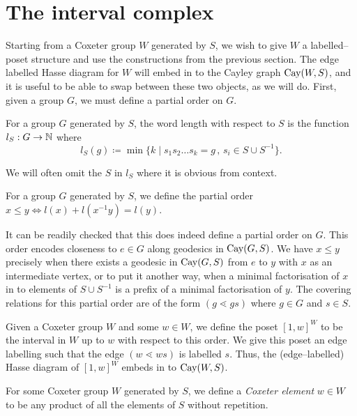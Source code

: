\documentclass[class=article, crop=false]{standalone}
\begin{document}
\section{The interval complex}
\label{sec:interval_cx}
Starting from a Coxeter group $W$ generated by $S$, we wish to give $W$ a labelled--poset structure and use the constructions from the previous section. The edge labelled Hasse diagram for $W$ will embed in to the Cayley graph $\text{Cay}(W,S)$, and it is useful to be able to swap between these two objects, as we will do. First, given a group $G$, we must define a partial order on $G$.

\begin{definition}
    For a group $G$ generated by $S$, the word length with respect to $S$ is the function $l_S:G\to \mathbb{\mathbb{N}}$ where
    \begin{equation*}
        l_S(g) \coloneq \min\{k \mid s_1s_2\ldots s_k=g \,,\, s_i \in S \cup S^{-1}\}.
    \end{equation*}
\end{definition}
We will often omit the $S$ in $l_S$ where it is obvious from context.

\begin{definition}
    For a group $G$ generated by $S$, we define the partial order $x \leq y \iff l(x) + l(x^{-1}y) = l(y)$.
\end{definition}

It can be readily checked that this does indeed define a partial 
order on $G$. This order encodes closeness to $e \in G$ along geodesics in $\text{Cay}(G,S)$. We have $x \leq y$ precisely when there exists a geodesic in $\text{Cay}(G, S)$ from $e$ to $y$ with $x$ as an intermediate vertex, or to put it another way, when a minimal factorisation of $x$ in to elements of $S \cup S^{-1}$ is a prefix of a minimal factorisation of $y$. The covering relations for this partial order are of the form $(g \lessdot gs)$ where $g \in G$ and $s \in S$.


Given a Coxeter group $W$ and some $w \in W$, we define the poset $[1,w]^W$ to be the interval in $W$ up to $w$ with respect to this order. We give this poset an edge labelling such that the edge $(w \lessdot ws)$ is labelled $s$. Thus, the (edge--labelled) Hasse diagram of $[1,w]^W$ embeds in to $\text{Cay}(W,S)$.

\begin{definition}
	For some Coxeter group $W$ generated by $S$, we define a \emph{Coxeter element} $w\in W$ to be any product of all the elements of $S$ without repetition.
\end{definition}
\end{document}
